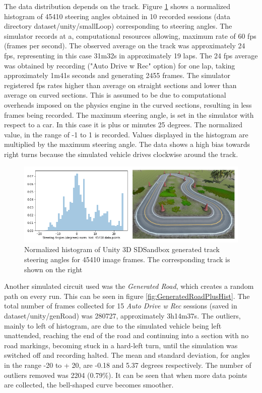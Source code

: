 The data distribution depends on the track. Figure \ref{fig:GeneratedTrackPlusHist} shows a normalized histogram of 45410 steering angles obtained in 10 recorded sessions (data directory dataset/unity/smallLoop) corresponding to steering angles. The simulator records at a, computational resources allowing, maximum rate of 60 fps (frames per second). The observed average on the track was approximately 24 fps, representing in this case 31m32s  in approximately 19 laps. The 24 fps average was obtained by recording ("Auto Drive w Rec" option) for one lap, taking approximately 1m41s seconds and generating 2455 frames. The simulator registered fps rates higher than average on straight sections and lower than average on curved sections. This is assumed to be due to computational overheads imposed on the physics engine in the curved sections, resulting in less frames being recorded. The maximum steering angle, is set in the simulator with respect to a car. In this case it is plus or minutes 25 degrees. The normalized value, in the range of -1 to 1 is recorded. Values displayed in the histogram are multiplied by the maximum steering angle. The data shows a high bias towards right turns because the simulated vehicle drives clockwise around the track.
\begin{figure}[ht]
 \centering 
 \includegraphics[width=\textwidth]{Figures/GeneratedTrackPlusHistogram.png}
 \caption{Normalized histogram of Unity 3D SDSandbox generated track steering angles for 45410 image frames. The corresponding track is shown on the right}
 \label{fig:GeneratedTrackPlusHist}
\end{figure}

Another simulated circuit used was the \textit{Generated Road}, which creates a random path on every run. This can be seen in figure \ref{fig:GeneratedRoadPlusHist}. The total number of frames collected for 15 \textit{Auto Drive w Rec} sessions (saved in dataset/unity/genRoad) was 280727, approximately 3h14m37s. The outliers, mainly to left of histogram, are due to the simulated vehicle being left unattended, reaching the end of the road and continuing into a section with no road markings, becoming stuck in a hard-left turn, until the simulation was switched off and recording halted. The mean and standard deviation, for angles in the range -20 to + 20, are -0.18 and 5.37 degrees respectively. The number of outliers removed was 2204 (0.79\%). It can be seen that when more data points are collected, the bell-shaped curve becomes smoother.

